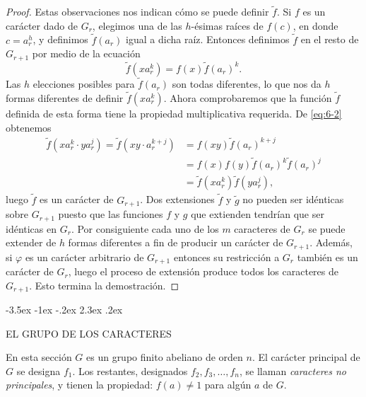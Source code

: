 \documentclass[12pt,a4paper]{book}
\makeatletter
\renewcommand\section{\@startsection{section}{1}{\z@}%
  {-3.5ex \@plus -1ex \@minus -.2ex}%
  {2.3ex \@plus .2ex}%
  {\normalfont\Large\bfseries\raggedright}}
\makeatother
\begin{document}
\begin{proof}
        Estas observaciones nos indican cómo se puede definir $\tilde{f}$. Si $f$ es un
        carácter dado de $G_{r}$, elegimos una de las $h$-ésimas raíces de $f(c)$, en donde
        $c=a_{r}^{h}$, y definimos $\tilde{f}(a_{r})$ igual a dicha raíz. Entonces definimos
        $\tilde{f}$ en el resto de $G_{r+1}$ por medio de la ecuación
        \begin{equation}\label{eq:6-2}
            \tilde{f}(xa_{r}^{k})=f(x)\tilde{f}(a_{r})^{k}.
        \end{equation}
        Las $h$ elecciones posibles para $\tilde{f}(a_{r})$ son todas diferentes, lo que nos
        da $h$ formas diferentes de definir $\tilde{f}(xa_{r}^{k})$. Ahora comprobaremos que la
        función $\tilde{f}$ definida de esta forma tiene la propiedad multiplicativa
        requerida. De \eqref{eq:6-2} obtenemos
        \begin{align*}
            \tilde{f}(xa_{r}^{k}\cdot ya_{r}^{j})=\tilde{f}(xy\cdot a_{r}^{k+j})
            &=f(xy)\tilde{f}(a_{r})^{k+j}\\
            &=f(x)f(y)\tilde{f}(a_{r})^{k}\tilde{f}(a_{r})^{j}\\
            &=\tilde{f}(xa_{r}^{k})\tilde{f}(ya_{r}^{j}),
        \end{align*}
        luego $\tilde{f}$ es un carácter de $G_{r+1}$. Dos extensiones $\tilde{f}$ y
        $\tilde{g}$ no pueden ser idénticas sobre $G_{r+1}$ puesto que las funciones $f$ y
        $g$ que extienden tendrían que ser idénticas en $G_{r}$. Por consiguiente cada uno de
        los $m$ caracteres de $G_{r}$ se puede extender de $h$ formas diferentes a fin de
        producir un carácter de $G_{r+1}$. Además, si $\varphi$ es un carácter arbitrario
        de $G_{r+1}$ entonces su restricción a $G_{r}$ también es un carácter de $G_{r}$, luego
        el proceso de extensión produce todos los caracteres de $G_{r+1}$. Esto termina la
        demostración.
    \end{proof}

    \section{EL GRUPO DE LOS CARACTERES}

    En esta sección $G$ es un grupo finito abeliano de orden $n$. El carácter principal de
    $G$ se designa $f_{1}$. Los restantes, designados $f_{2},f_{3},\dots,f_{n}$, se llaman
    \textit{caracteres no principales}, y tienen la propiedad: $f(a)\neq1$ para algún $a$
    de $G$.
\end{document}
